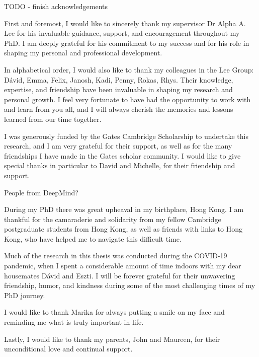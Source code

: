 
\begin{acknowledgements}

TODO - finish acknowledgements

First and foremost, I would like to sincerely thank my supervisor Dr Alpha A. Lee for his invaluable guidance, support, and encouragement throughout my PhD. I am deeply grateful for his commitment to my success and for his role in shaping my personal and professional development.

In alphabetical order, I would also like to thank my colleagues in the Lee Group: Dávid, Emma, Felix, Janosh, Kadi, Penny, Rokas, Rhys. Their knowledge, expertise, and friendship have been invaluable in shaping my research and personal growth. I feel very fortunate to have had the opportunity to work with and learn from you all, and I will always cherish the memories and lessons learned from our time together.

I was generously funded by the Gates Cambridge Scholarship to undertake this research, and I am very grateful for their support, as well as for the many friendships I have made in the Gates scholar community. I would like to give special thanks in particular to David and Michelle, for their friendship and support.

People from DeepMind?

During my PhD there was great upheaval in my birthplace, Hong Kong. I am thankful for the camaraderie and solidarity from my fellow Cambridge postgraduate students from Hong Kong, as well as friends with links to Hong Kong, who have helped me to navigate this difficult time.

Much of the research in this thesis was conducted during the COVID-19 pandemic, when I spent a considerable amount of time indoors with my dear housemates Dávid and Eszti. I will be forever grateful for their unwavering friendship, humor, and kindness during some of the most challenging times of my PhD journey.

I would like to thank Marika for always putting a smile on my face and reminding me what is truly important in life.

Lastly, I would like to thank my parents, John and Maureen, for their unconditional love and continual support.

\end{acknowledgements}
